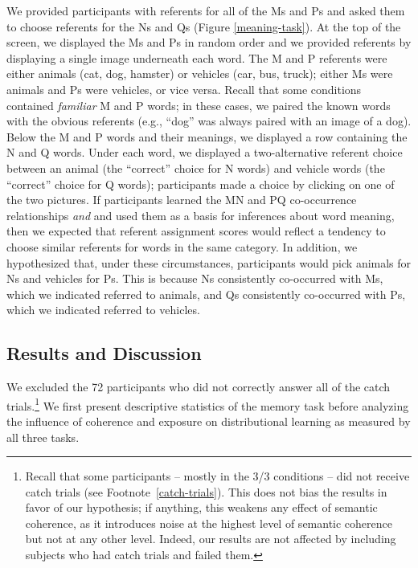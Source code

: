 \documentclass[man,floatsintext]{apa6}
\begin{document}
We provided participants with referents for all of the Ms and Ps and asked them to choose referents for the Ns and Qs (Figure \ref{meaning-task}). At the top of the screen, we displayed the Ms and Ps in random order and we provided referents by displaying a single image underneath each word. The M and P referents were either animals (cat, dog, hamster) or vehicles (car, bus, truck); either Ms were animals and Ps were vehicles, or vice versa. Recall that some conditions contained \emph{familiar} M and P words; in these cases, we paired the known words with the obvious referents (e.g., ``dog'' was always paired with an image of a dog). Below the M and P words and their meanings, we displayed a row containing the N and Q words. Under each word, we displayed a two-alternative referent choice between an animal (the ``correct'' choice for N words) and vehicle words (the ``correct'' choice for Q words); participants made a choice by clicking on one of the two pictures. If participants learned the MN and PQ co-occurrence relationships \emph{and} and used them as a basis for inferences about word meaning, then we expected that referent assignment scores would reflect a tendency to choose similar referents for words in the same category. In addition, we hypothesized that, under these circumstances, participants would pick animals for Ns  and vehicles for Ps. This is because Ns consistently co-occurred with Ms, which we indicated referred to animals, and Qs consistently co-occurred with Ps, which we indicated referred to vehicles.

\subsection{Results and Discussion}
We excluded the 72 participants who did not correctly answer all of the catch trials.\footnote{ Recall that some participants -- mostly in the 3/3 conditions --  did not receive catch trials (see Footnote~\ref{catch-trials}). This does not bias the results in favor of our hypothesis; if anything, this weakens any effect of semantic coherence, as it introduces noise at the highest level of semantic coherence but not at any other level. Indeed, our results are not affected by including subjects who had catch trials and failed them.} We first present descriptive statistics of the memory task before analyzing the influence of coherence and exposure on distributional learning as measured by all three tasks.
\end{document}
